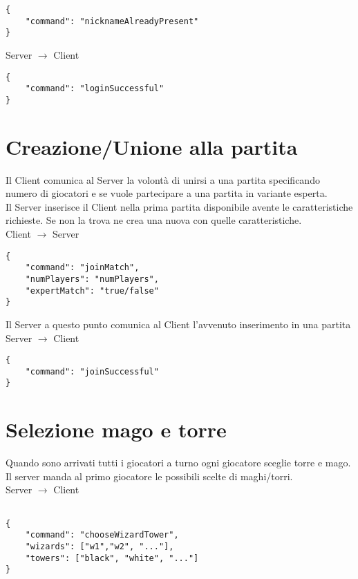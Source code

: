 \documentclass{article}
\begin{document}
\begin{verbatim}
{
	"command": "nicknameAlreadyPresent"
}
\end{verbatim}

\noindent Server $\rightarrow$ Client

\begin{verbatim}
{
	"command": "loginSuccessful"
}
\end{verbatim}

\bigskip
\section{Creazione/Unione alla partita}

Il Client comunica al Server la volontà di unirsi a una partita specificando numero di giocatori e se vuole partecipare a una partita in variante esperta.\\
Il Server inserisce il Client nella prima partita disponibile avente le caratteristiche richieste. Se non la trova ne crea una nuova con quelle caratteristiche.\\

\noindent Client $\rightarrow$ Server

\begin{verbatim}
{
	"command": "joinMatch",
	"numPlayers": "numPlayers",
	"expertMatch": "true/false"
}
\end{verbatim}

\noindent Il Server a questo punto comunica al Client l'avvenuto inserimento in una partita\\

\noindent Server $\rightarrow$ Client

\begin{verbatim}
{
	"command": "joinSuccessful"
}
\end{verbatim}

\bigskip
\section{Selezione mago e torre}

Quando sono arrivati tutti i giocatori a turno ogni giocatore sceglie torre e mago.\\
Il server manda al primo giocatore le possibili scelte di maghi/torri.\\

\noindent Server $\rightarrow$ Client

\begin{verbatim}

{
	"command": "chooseWizardTower",
	"wizards": ["w1","w2", "..."],
	"towers": ["black", "white", "..."]
}
\end{verbatim}
\end{document}
